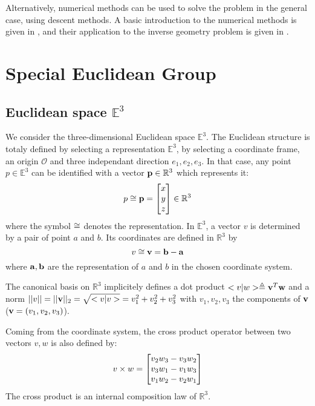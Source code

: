 \documentclass{book}
\begin{document}
Alternatively, numerical methods can be used to solve the problem in the general case, using descent methods. A basic introduction to the numerical methods is given in , and their application to the inverse geometry problem is given in .

\chapter{Special Euclidean Group} \label{sec:se3}

\section{Euclidean space $\mathbb{E}^3$}

We consider the three-dimensional Euclidean space  $\mathbb{E}^3$. The Euclidean structure is totaly defined by selecting a representation $\mathbb{E}^3$, by selecting a coordinate frame, \mie an origin $\mathcal{O}$ and three independant direction $e_1,e_2,e_3$. In that case, any point $p \in \mathbb{E}^3$ can be identified with a vector $\mathbf{p} \in \mathbb{R}^3$ which represents it:
\[ p \cong \mathbf{p} = \begin{bmatrix} x \\ y \\ z \end{bmatrix} \in \mathbb{R}^3 \] 
where the symbol $\cong$ denotes the representation. In $\mathbb{E}^3$, a vector $v$ is determined by a pair of point $a$ and $b$. Its coordinates are defined in $\mathbb{R}^3$ by 
\[ v \cong \mathbf{v} = \mathbf{b} - \mathbf{a} \]
where $\mathbf{a},\mathbf{b}$ are the representation of $a$ and $b$ in the chosen coordinate system.

The canonical basis on $\mathbb{R}^3$ implicitely defines a dot product $<v|w> \triangleq \mathbf{v}^T \mathbf{w}$ and a norm $|| v || = || \mathbf{v}||_2 = \sqrt{<v|v>} = v_1^2 + v_2^2 + v_3^2$ with $v_1,v_2,v_3$ the components of $\mathbf{v}$ ($\mathbf{v} = (v_1,v_2,v_3)$).

Coming from the coordinate system, the cross product operator between two vectors $v,w$ is also defined by:
\[ v \times w  = \begin{bmatrix} v_2 w_3 - v_3 w_2 \\ v_3 w_1 - v_1 w_3 \\ v_1 w_2 - v_2 w_1 \end{bmatrix} \]
The cross product is an internal composition law of $\mathbb{R}^3$.
\end{document}
